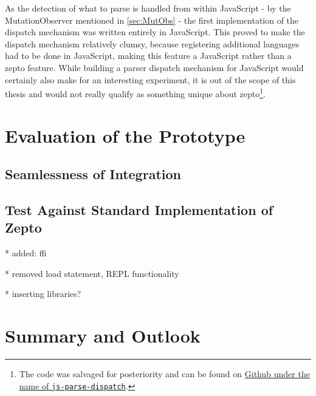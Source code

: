 \documentclass[oneside,11pt,xetex]{scrbook}
\begin{document}
As the detection of what to parse is handled from within JavaScript - by the
MutationObserver mentioned in \ref{sec:MutObs} - the first implementation
of the dispatch mechanism was written entirely in JavaScript. This proved
to make the dispatch mechanism relatively clumsy, because registering
additional languages had to be done in JavaScript, making this feature
a JavaScript rather than a zepto feature. While building a parser dispatch
mechanism for JavaScript would certainly also make for an interesting experiment,
it is out of the scope of this thesis and would not really qualify as something
unique about zepto\footnote{The code was salvaged for posteriority and can be
found on \href{https://github.com/hellerve/js-parse-dispatch}{Github under the
name of \texttt{js-parse-dispatch}}.}.



\clearpage

\chapter{Evaluation of the Prototype}
\label{chap:evaluation}

\section{Seamlessness of Integration}

\section{Test Against Standard Implementation of Zepto}

* added: ffi

* removed load statement, REPL functionality

* inserting libraries?

\chapter{Summary and Outlook}
\label{chap:outlook}
\end{document}
